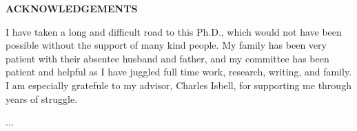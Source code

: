 \clearpage
\begin{centering}
\textbf{ACKNOWLEDGEMENTS}\\
\vspace{\baselineskip}
\end{centering}


I have taken a long and difficult road to this Ph.D., which would not have been possible without the support of many kind people. My family has been very patient with their absentee husband and father, and my committee has been patient and helpful as I have juggled full time work, research, writing, and family. I am especially gratefule to my advisor, Charles Isbell, for supporting me through years of struggle.

...


\clearpage
